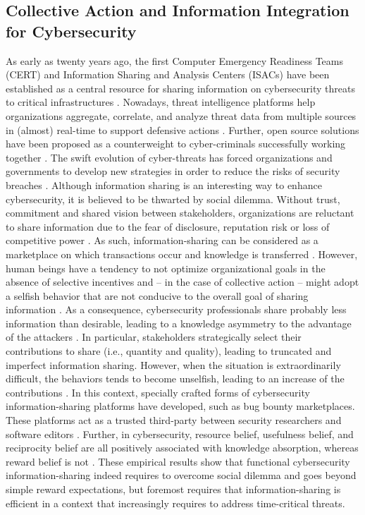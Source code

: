 \documentclass[unnumsec,webpdf,contemporary,large]{oup-authoring-template}%
\theoremstyle{thmstyleone}%
\theoremstyle{thmstyletwo}%
\theoremstyle{thmstylethree}%
\begin{document}
\subsection{Collective Action and Information Integration for Cybersecurity}

As early as twenty years ago, the first Computer Emergency Readiness Teams (CERT) and Information Sharing and Analysis Centers (ISACs) have been established as a central resource for sharing information on cybersecurity threats to critical infrastructures \cite{zheng_cyber_2015}. Nowadays, threat intelligence platforms help organizations aggregate, correlate, and analyze threat data from multiple sources in (almost) real-time to support defensive actions \cite{he_perspectives_2018}. Further, open source solutions have been proposed as a counterweight to cyber-criminals successfully working together \cite{bohme_back_2016}.
The swift evolution of cyber-threats has forced organizations and governments to develop new strategies \cite{meier_feedrank_2018} in order to reduce the risks of security breaches \cite{safa_information_2016}. Although information sharing
is an interesting way to enhance cybersecurity, it is believed to be thwarted by social dilemma. Without trust, commitment and shared vision between stakeholders, organizations are reluctant to share information due to the fear of disclosure, reputation risk or loss of competitive power \cite{mermoud_share_2019}. As such, information-sharing can be considered as a marketplace on which transactions occur and knowledge is transferred \cite{perciadavid_knowledge_2020}. However, human beings have a tendency to not optimize organizational goals \cite{mermoud_governance_2019} in the absence of selective incentives \cite{oliver_reward_1980} and – in the case of collective action – might adopt a selfish behavior that are not conducive to the overall goal of sharing information \cite{laube_strategic_2017}. As a consequence, cybersecurity professionals share probably less information than desirable, leading to a knowledge asymmetry to the advantage of the attackers \cite{laube_strategic_2017}. In particular, stakeholders strategically select their contributions to share (i.e., quantity and quality), leading to truncated and imperfect information sharing. However, when the situation is extraordinarily difficult, the behaviors tends to become unselfish, leading to an increase of the contributions \cite{hirshleifer_weakest-link_1983}.
In this context, specially crafted forms of cybersecurity information-sharing platforms have developed, such as bug bounty marketplaces. These platforms act as a trusted third-party between security researchers and software editors \cite{maillart_given_2017}. Further, in cybersecurity, resource belief, usefulness belief, and reciprocity belief are all positively associated with knowledge absorption, whereas reward belief is not \cite{perciadavid_knowledge_2020}. These empirical results show that functional cybersecurity information-sharing indeed requires to overcome social dilemma and goes beyond simple reward expectations, but foremost requires that information-sharing is efficient in a context that increasingly requires to address time-critical threats.
\end{document}
